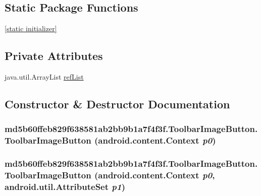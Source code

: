\subsection*{Static Package Functions}
\begin{CompactItemize}
\item 
\hyperlink{classmd5b60ffeb829f638581ab2bb9b1a7f4f3f_1_1_toolbar_image_button_28253b0846a1b912af0fe8c8aef8479a}{\mbox{[}static initializer\mbox{]}}
\end{CompactItemize}
\subsection*{Private Attributes}
\begin{CompactItemize}
\item 
java.util.ArrayList \hyperlink{classmd5b60ffeb829f638581ab2bb9b1a7f4f3f_1_1_toolbar_image_button_0a2d6944fb1b2de17004833a15342f25}{refList}
\end{CompactItemize}


\subsection{Constructor \& Destructor Documentation}
\hypertarget{classmd5b60ffeb829f638581ab2bb9b1a7f4f3f_1_1_toolbar_image_button_5b82e6fb711d83ddca88b91ff6a3fac3}{
\subsubsection[{ToolbarImageButton}]{\setlength{\rightskip}{0pt plus 5cm}md5b60ffeb829f638581ab2bb9b1a7f4f3f.ToolbarImageButton.ToolbarImageButton (android.content.Context {\em p0})}}
\label{classmd5b60ffeb829f638581ab2bb9b1a7f4f3f_1_1_toolbar_image_button_5b82e6fb711d83ddca88b91ff6a3fac3}


\hypertarget{classmd5b60ffeb829f638581ab2bb9b1a7f4f3f_1_1_toolbar_image_button_e32a9e49a9fa0aa0435c1f35ef1f08a5}{
\subsubsection[{ToolbarImageButton}]{\setlength{\rightskip}{0pt plus 5cm}md5b60ffeb829f638581ab2bb9b1a7f4f3f.ToolbarImageButton.ToolbarImageButton (android.content.Context {\em p0}, \/  android.util.AttributeSet {\em p1})}}
\label{classmd5b60ffeb829f638581ab2bb9b1a7f4f3f_1_1_toolbar_image_button_e32a9e49a9fa0aa0435c1f35ef1f08a5}


